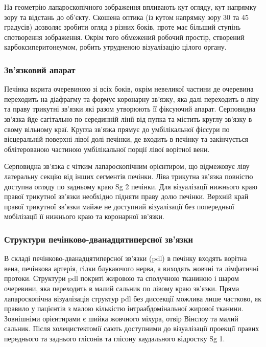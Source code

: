 \begin{refsection}
На геометрію лапароскопічного зображення впливають кут огляду, кут напрямку зору та відстань до об'єкту. Скошена оптика (із кутом напрямку зору 30 та 45 градусів) дозволяє зробити огляд з різних боків, проте має більший ступінь спотворення зображення. Окрім того обмежений робочий простір, створений карбоксиперитонеумом, робить утрудненою візуалізацію цілого органу.

\subsubsection{Зв'язковий апарат}

Печінка вкрита очеревиною зі всіх боків, окрім невеликої частини  де очеревина переходить на діафрагму та формує коронарну зв'язку, яка далі переходить в ліву та праву трикутні зв'язки які разом утворюють її фіксуючий апарат. Серповидна зв'язка йде сагітально по серединній лінії від пупка та містить круглу зв'язку в свому вільному краї. Кругла зв'язка прямує до умбілікальної фіссури по вісцеральній поверхні лівої долі печінки, де входить в печінку та закінчується облітерованою частиною умбілікальної порції лівої ворітної вени. 

Серповидна зв'язка є чітким лапароскопічним орієнтиром, що відмежовує ліву латеральну секцію від інших сегментів печінки. Ліва трикутна зв'язка повністю доступна огляду по задньому краю Sg 2 печінки. Для візуалізації нижнього краю правої трикутної зв'язки необхідно підняти праву долю печінки. Верхній край правої трикутної зв'язки майже не доступний візуалізації без попередньої мобілізації її нижнього краю та коронарної зв'язки. 

\subsubsection{Структури печінково-дванадцятиперсної зв'язки}

В складі печінково-дванадцятиперсної зв'язки (\acrshort{pdl}) в печінку входять ворітна вена, печінкова артерія, гілки блукаючого нерва, а виходять жовчні та лімфатичні протоки. Структури \acrshort{pdl} покриті жировою та сполучною тканиною і шаром очеревини, яка переходить в малий сальник по лівому краю зв'язки. Пряма лапароскопічна візуалізація структур \acrshort{pdl} без диссекції можлива лише частково, як правило у пацієнтів з малою кількістю інтраабдомінальної жирової тканини. Зовнішніми орієнтирами є шийка жовчного міхура, отвір Вінслоу та малий сальник. Після холецистектомії сають доступними до візуалізації проекції правих переднього та заднього глісонів та глісону каудального відростку Sg 1. 


\end{refsection}
